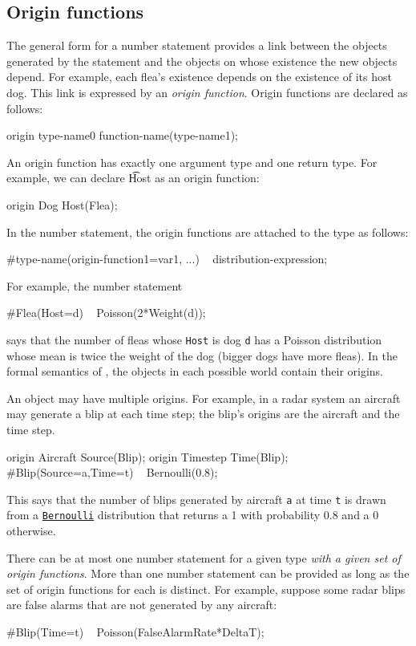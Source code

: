 \documentclass[12pt]{article}
\begin{document}
\subsection{Origin functions}\label{origin-section}
The general form for a number statement provides a link between the objects generated by the statement
and the objects on whose existence the new objects depend. For example, each flea's existence
depends on the existence of its host dog. This link is expressed by an {\em origin function}.
Origin functions are declared as follows:
\begin{blogcode}
origin type-name0 function-name(type-name1);
\end{blogcode}
An origin function has exactly one argument type and one return type.  
For example, we can declare {\t Host} as an origin function:
\begin{blogcode}
origin Dog Host(Flea);
\end{blogcode}

In the number statement, the origin functions are attached to the type 
as follows:
\begin{blogcode}
#type-name(origin-function1=var1, ...) ~ distribution-expression;
\end{blogcode}
For example, the number statement
\begin{blogcode}
#Flea(Host=d) ~ Poisson(2*Weight(d));
\end{blogcode}
says that the number of fleas whose {\tt Host} is dog {\tt d} has a Poisson distribution whose mean is twice the weight of the dog (bigger dogs have more fleas).
In the formal semantics of \bl, the objects in each possible world contain their origins.

An object may have multiple origins. For example, in a radar system an aircraft may generate a blip at each time step; the blip's origins are the aircraft and the time step.
\begin{blogcode}
origin Aircraft Source(Blip);
origin Timestep Time(Blip);
#Blip(Source=a,Time=t) ~ Bernoulli(0.8);
\end{blogcode}
This says that the number of blips generated by aircraft {\tt a} at time {\tt t} is drawn from
a \hyperref[builtin-distribution-appendix]{{\tt Bernoulli}} distribution that returns a 1 with probability 0.8 and a 0 otherwise.

There can be at most one number statement for a given type {\em with a given set of origin functions}. More than one number statement
can be provided as long as the set of origin functions for each is distinct. For example, suppose some radar blips are false alarms
that are not generated by any aircraft:
\begin{blogcode}
#Blip(Time=t) ~ Poisson(FalseAlarmRate*DeltaT);
\end{blogcode}
\end{document}
